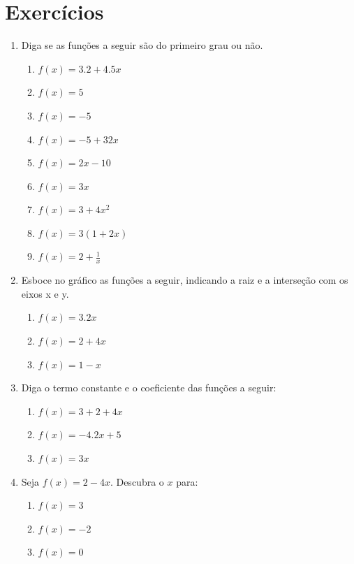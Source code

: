 \documentclass[11pt]{article}
\begin{document}
\section{Exercícios}
\begin{enumerate}
	\item Diga se as funções a seguir são do primeiro grau ou não.
		\begin{enumerate}
			\item $f(x) = 3.2 + 4.5x$
			\item $f(x) = 5$
			\item $f(x) = -5$
			\item $f(x) = -5 + 32x$
			\item $f(x) = 2x - 10$
			\item $f(x) = 3x$
			\item $f(x) = 3 + 4x^2$
			\item $f(x) = 3(1 + 2x)$
			\item $f(x) = 2 + \frac{1}{x}$
		\end{enumerate}

	\item Esboce no gráfico as funções a seguir, indicando a raiz e a 
		  interseção com os eixos x e y.
		\begin{enumerate}
			\item $f(x) = 3.2x$
			\item $f(x) = 2 + 4x$
			\item $f(x) = 1 - x$
		\end{enumerate}

	\item Diga o termo constante e o coeficiente das funções a seguir:
		\begin{enumerate}
			\item $f(x) = 3 + 2 + 4x$
			\item $f(x) = -4.2x + 5$
			\item $f(x) = 3x$
		\end{enumerate}

	\item Seja $f(x) = 2 - 4x$. Descubra o $x$ para:
		\begin{enumerate}
			\item $f(x) = 3$
			\item $f(x) = -2$
			\item $f(x) = 0$
		\end{enumerate}
\end{enumerate}

\newpage
\end{document}
